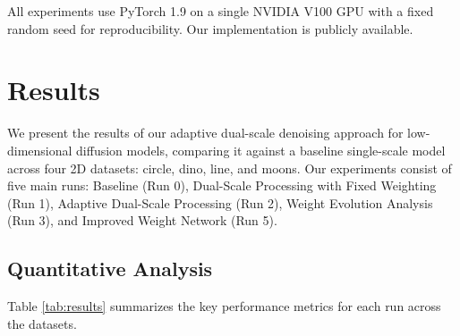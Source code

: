 \documentclass{article} %
\begin{document}
All experiments use PyTorch 1.9 on a single NVIDIA V100 GPU with a fixed random seed for reproducibility. Our implementation is publicly available.

\section{Results}
\label{sec:results}

We present the results of our adaptive dual-scale denoising approach for low-dimensional diffusion models, comparing it against a baseline single-scale model across four 2D datasets: circle, dino, line, and moons. Our experiments consist of five main runs: Baseline (Run 0), Dual-Scale Processing with Fixed Weighting (Run 1), Adaptive Dual-Scale Processing (Run 2), Weight Evolution Analysis (Run 3), and Improved Weight Network (Run 5).

\subsection{Quantitative Analysis}

Table \ref{tab:results} summarizes the key performance metrics for each run across the datasets.
\end{document}
